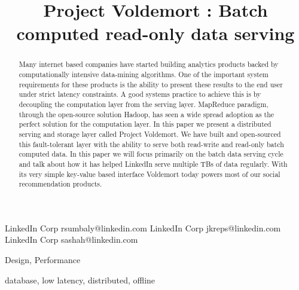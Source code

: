 \documentclass[10pt,twocolumn,preprint,natbib,authoryear]{sigplanconf}
\begin{document}
\copyrightdata{[to be supplied]} 


\title{Project Voldemort : Batch computed read-only data serving}

           {LinkedIn Corp}
           {rsumbaly@linkedin.com}
           {LinkedIn Corp}
           {jkreps@linkedin.com}
		   {LinkedIn Corp}
           {sashah@linkedin.com}

				
\maketitle

\begin{abstract}
Many internet based companies have started building analytics products backed by computationally intensive data-mining algorithms. One of the important system requirements for these products is the ability to present these results to the end user under strict latency constraints. A good systems practice to achieve this is by decoupling the computation layer from the serving layer. MapReduce paradigm, through the open-source solution Hadoop, has seen a wide spread adoption as the perfect solution for the computation layer. In this paper we present a distributed serving and storage layer called Project Voldemort. We have built and open-sourced this fault-tolerant layer with the ability to serve both read-write and read-only batch computed data. In this paper we will focus primarily on the batch data serving cycle and talk about how it has helped LinkedIn serve multiple TBs of data regularly. With its very simple key-value based interface Voldemort today powers most of our social recommendation products. 
\end{abstract}


\terms
Design, Performance

\keywords
database, low latency, distributed, offline
\end{document}
